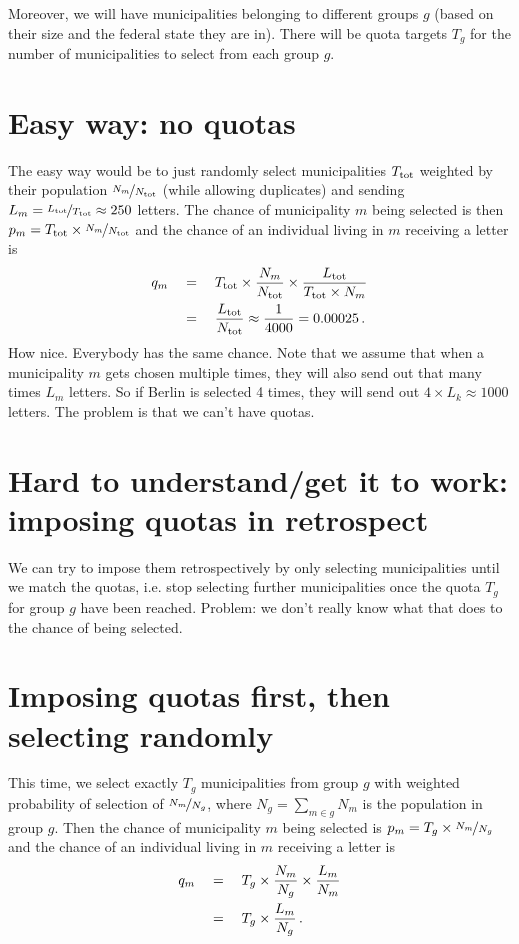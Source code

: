 \documentclass[%
 draft,
 aapm,
 mph,%
 amsmath,amssymb,
 reprint,%
]{revtex4-2}
\begin{document}
Moreover, we will have municipalities belonging to different groups $g$ (based on their size and the federal state they are in). There will be quota targets $T_g$ for the number of municipalities to select from each group $g$.


\section{Easy way: no quotas}
The easy way would be to just randomly select municipalities $T_{\mathrm{tot}}$ weighted by their population $\nicefrac{N_m}{N_{\mathrm{tot}}}$ (while allowing duplicates) and sending $L_m = \nicefrac{L_{\mathrm{tot}}}{T_{\mathrm{tot}}} \approx 250$ letters. The chance of municipality $m$ being selected is then $p_m = T_{\mathrm{tot}} \times \nicefrac{N_m}{N_{\mathrm{tot}}}$ and the chance of an individual living in $m$ receiving a letter is
\begin{align}
    q_m \quad
    &=  \quad T_{\mathrm{tot}} \times \frac{N_m}{N_{\mathrm{tot}}} \times \frac{L_{\mathrm{tot}}}{T_{\mathrm{tot}} \times N_m} \nonumber\\
    &=  \quad \frac{L_{\mathrm{tot}}}{N_{\mathrm{tot}}} \approx \frac{1}{4000} = 0.00025 \,.
\end{align}
How nice. Everybody has the same chance. Note that we assume that when a municipality $m$ gets chosen multiple times, they will also send out that many times $L_m$ letters. So if Berlin is selected 4 times, they will send out $4 \times L_k \approx 1000$ letters. The problem is that we can't have quotas.


\section{Hard to understand/get it to work: imposing quotas in retrospect}
We can try to impose them retrospectively by only selecting municipalities until we match the quotas, i.e. stop selecting further municipalities once the quota $T_g$ for group $g$ have been reached. Problem: we don't really know what that does to the chance of being selected.


\section{Imposing quotas first, then selecting randomly}
This time, we select exactly $T_g$ municipalities from group $g$ with weighted probability of selection of $\nicefrac{N_m}{N_g}$, where $N_g = \sum_{m\in g} N_m$ is the population in group $g$. Then the chance of municipality $m$ being selected is $p_m = T_g \times \nicefrac{N_m}{N_g}$ and the chance of an individual living in $m$ receiving a letter is
\begin{align}
    q_m \quad
    &=  \quad T_g \times \frac{N_m}{N_g} \times \frac{L_m}{N_m} \\
    &=  \quad T_g \times \frac{L_m}{N_g} \,.
\end{align}
\end{document}
